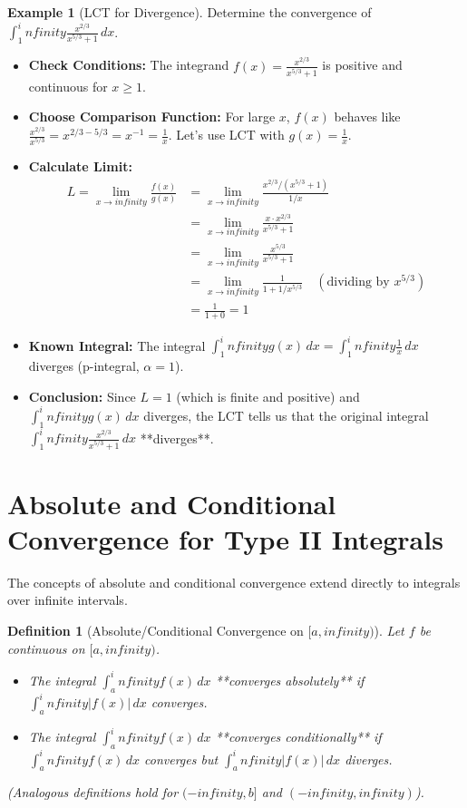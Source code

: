 \documentclass[11pt]{article}
\def\infty{infinity}%
\newtheorem{definition}[theorem]{Definition}
\theoremstyle{definition}
\newtheorem{example}[theorem]{Example}
\newcommand{\dx}{\, dx} %
\begin{document}
\begin{example}[LCT for Divergence] \label{ex:poly_ratio_div}
    Determine the convergence of $\int_1^\infty \frac{x^{2/3}}{x^{5/3} + 1} \dx$.
    \begin{itemize}
        \item \textbf{Check Conditions:} The integrand $f(x) = \frac{x^{2/3}}{x^{5/3} + 1}$ is positive and continuous for $x \ge 1$.
        \item \textbf{Choose Comparison Function:} For large $x$, $f(x)$ behaves like $\frac{x^{2/3}}{x^{5/3}} = x^{2/3 - 5/3} = x^{-1} = \frac{1}{x}$. Let's use LCT with $g(x) = \frac{1}{x}$.
        \item \textbf{Calculate Limit:}
          \begin{align*} L = \lim_{x \to \infty} \frac{f(x)}{g(x)} &= \lim_{x \to \infty} \frac{x^{2/3}/(x^{5/3} + 1)}{1/x} \\ &= \lim_{x \to \infty} \frac{x \cdot x^{2/3}}{x^{5/3} + 1} \\ &= \lim_{x \to \infty} \frac{x^{5/3}}{x^{5/3} + 1} \\ &= \lim_{x \to \infty} \frac{1}{1 + 1/x^{5/3}} \quad (\text{dividing by } x^{5/3}) \\ &= \frac{1}{1+0} = 1 \end{align*}
        \item \textbf{Known Integral:} The integral $\int_1^\infty g(x) \dx = \int_1^\infty \frac{1}{x} \dx$ diverges (p-integral, $\alpha=1$).
        \item \textbf{Conclusion:} Since $L = 1$ (which is finite and positive) and $\int_1^\infty g(x) \dx$ diverges, the LCT tells us that the original integral $\int_1^\infty \frac{x^{2/3}}{x^{5/3} + 1} \dx$ **diverges**.
    \end{itemize}
\end{example}

\section{Absolute and Conditional Convergence for Type II Integrals}

The concepts of absolute and conditional convergence extend directly to integrals over infinite intervals.

\begin{definition}[Absolute/Conditional Convergence on $[a, \infty)$]
    Let $f$ be continuous on $[a, \infty)$.
    \begin{itemize}
        \item The integral $\int_a^\infty f(x) \dx$ **converges absolutely** if $\int_a^\infty |f(x)| \dx$ converges.
        \item The integral $\int_a^\infty f(x) \dx$ **converges conditionally** if $\int_a^\infty f(x) \dx$ converges but $\int_a^\infty |f(x)| \dx$ diverges.
    \end{itemize}
    (Analogous definitions hold for $(-\infty, b]$ and $(-\infty, \infty)$).
\end{definition}
\end{document}
